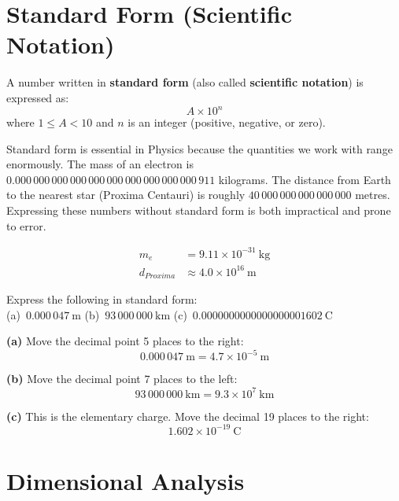 \section{Standard Form (Scientific Notation)}
\label{sec:standard_form}

\begin{definitionbox}
A number written in \textbf{standard form} (also called
\textbf{scientific notation}) is expressed as:
\[
  A \times 10^n
\]
where $1 \leq A < 10$ and $n$ is an integer (positive,
negative, or zero).
\end{definitionbox}

Standard form is essential in Physics because the quantities
we work with range enormously. The mass of an electron is
$0.000\,000\,000\,000\,000\,000\,000\,000\,000\,000\,911$
kilograms. The distance from Earth to the nearest star
(Proxima Centauri) is roughly
$40\,000\,000\,000\,000\,000$ metres. Expressing these
numbers without standard form is both impractical and prone
to error.

\begin{align*}
  m_e &= 9.11 \times 10^{-31}\ \text{kg}\\
  d_{Proxima} &\approx 4.0 \times 10^{16}\ \text{m}
\end{align*}

\begin{examplebox}[1.4]
Express the following in standard form:\\
(a)\ $0.000\,047\ \text{m}$\qquad
(b)\ $93\,000\,000\ \text{km}$\qquad
(c)\ $0.0000000000000000001602\ \text{C}$
\end{examplebox}

\begin{solutionbox}
\textbf{(a)} Move the decimal point 5 places to the right:
\[
  0.000\,047\ \text{m} = 4.7 \times 10^{-5}\ \text{m}
\]

\textbf{(b)} Move the decimal point 7 places to the left:
\[
  93\,000\,000\ \text{km} = 9.3 \times 10^7\ \text{km}
\]

\textbf{(c)} This is the elementary charge. Move the
decimal 19 places to the right:
\[
  1.602 \times 10^{-19}\ \text{C}
\]
\end{solutionbox}

\section{Dimensional Analysis}
\label{sec:dimensional_analysis}

